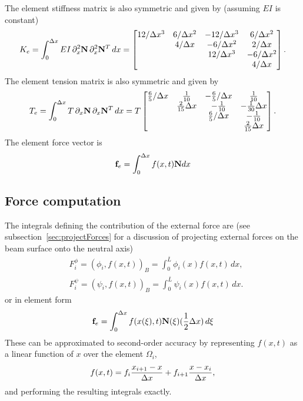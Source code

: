 \documentclass[11pt]{article}
\newcommand{\Ls}{\bar{L}}
\begin{document}
The element stiffness matrix is also symmetric and given by  (assuming $EI$ is constant)
\begin{align}
   K_e = \int_0^{\Delta x} EI \, \partial_x^2\mathbf{ N} \, \partial_x^2\mathbf{ N}^T \, dx = 
\begin{bmatrix}
12/\Delta x^3 & 6/\Delta x^2 & -12/\Delta x^3 & 6/\Delta x^2 \\
         & 4/\Delta x   & -6/\Delta x^2  & 2/\Delta x   \\
         &         & 12/\Delta x^3  &-6/\Delta x^2 \\
         &         &           &4/\Delta x
\end{bmatrix}.
\end{align} 
The element tension matrix is also symmetric and given by 
\begin{align}
   T_e = \int_0^{\Delta x} T \, \partial_x\mathbf{ N} \, \partial_x\mathbf{ N}^T \, dx = 
T 
\begin{bmatrix}
\frac{6}{5}/\Delta x & \frac{1}{10} & -\frac{6}{5}/\Delta x & \frac{1}{10} \\
         & \frac{2}{15}\Delta x   & -\frac{1}{10}  & -\frac{1}{30}\Delta x   \\
         &         & \frac{6}{5}/\Delta x  &-\frac{1}{10} \\
         &         &           &\frac{2}{15}\Delta x
\end{bmatrix}.
\end{align} 
% 
The element force vector is 
\begin{align}
 \mathbf{ f}_e = \int_0^{\Delta x} f(x,t) \mathbf{ N} dx
\end{align} 

\subsection{Force computation} \label{eq:BeamModel_ForceComputation}

The integrals defining the contribution of the external force are 
(see subsection~\ref{sec:projectForces} for a discussion of projecting external forces on the beam surface onto the neutral axis)
\begin{align}
& F_i^\phi  = ( \phi_i, f(x,t) )_B  = \int_0^{\Ls} \phi_i(x) f(x,t) \, dx, \label{eq:elementForcePhi} \\
& F_i^\psi =  ( \psi_i, f(x,t) )_B  = \int_0^{\Ls} \psi_i(x) f(x,t) \, dx. \label{eq:elementForcePsi}
\end{align}
or in element form
\begin{align}
 \mathbf{ f}_e = \int_0^{\Delta x} f(x(\xi),t) \mathbf{ N}(\xi) ({1\over2} \Delta x) \, d\xi
\end{align} 
These can be approximated to second-order accuracy by representing $f(x,t)$ as a linear
function of $x$ over the element $\Omega_i$,
\begin{align}
   f(x,t) = f_i\frac{x_{i+1}-x}{\Delta x}  + f_{i+1} \frac{x-x_i}{\Delta x} ,
\end{align}
and performing the resulting integrals exactly. 
\end{document}
